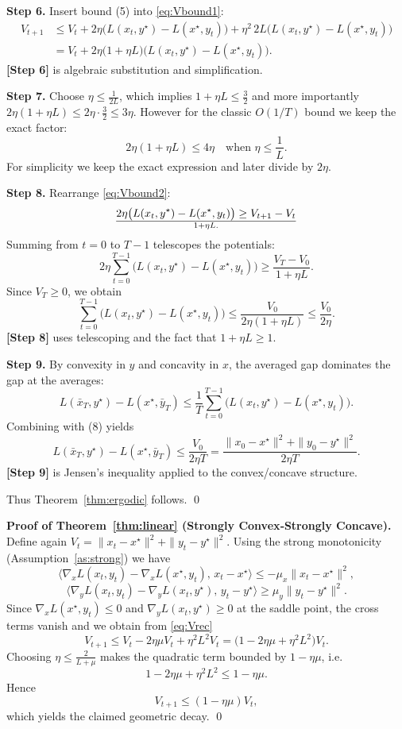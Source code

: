 \documentclass{article}
\newcommand{\grad}{\nabla}
\begin{document}
\bigskip
\noindent\textbf{Step 6.}  Insert bound (5) into \eqref{eq:Vbound1}:
\begin{align}
V_{t+1}&\le V_{t}+2\eta\bigl(L(x_{t},y^{\star})-L(x^{\star},y_{t})\bigr)
        +\eta^{2}\,2L\bigl(L(x_{t},y^{\star})-L(x^{\star},y_{t})\bigr)\nonumber\\
&=V_{t}+2\eta\bigl(1+ \eta L\bigr)\bigl(L(x_{t},y^{\star})-L(x^{\star},y_{t})\bigr).
\label{eq:Vbound2}
\end{align}
\noindent\textbf{[Step 6]} is algebraic substitution and simplification.

\bigskip
\noindent\textbf{Step 7.}  Choose $\eta\le\frac{1}{2L}$, which implies $1+\eta L\le\frac32$ and more importantly $2\eta(1+\eta L)\le 2\eta\cdot\frac32\le 3\eta$.  However for the classic $O(1/T)$ bound we keep the exact factor:
\[
2\eta(1+\eta L)\le 4\eta\quad\text{when }\eta\le\frac{1}{L}.
\]
For simplicity we keep the exact expression and later divide by $2\eta$.

\bigskip
\noindent\textbf{Step 8.}  Rearrange \eqref{eq:Vbound2}:
\[
2\eta\bigl(L(x_{t},y^{\star})-L(x^{\star},y_{t})\bigr)
\ge V_{t+1}-V_{t}\over {1+\eta L}.
\]
Summing from $t=0$ to $T-1$ telescopes the potentials:
\[
2\eta\sum_{t=0}^{T-1}\bigl(L(x_{t},y^{\star})-L(x^{\star},y_{t})\bigr)
\ge \frac{V_{T}-V_{0}}{1+\eta L}.
\]
Since $V_{T}\ge0$, we obtain
\[
\sum_{t=0}^{T-1}\bigl(L(x_{t},y^{\star})-L(x^{\star},y_{t})\bigr)
\le \frac{V_{0}}{2\eta(1+\eta L)}\le \frac{V_{0}}{2\eta}.
\tag{8}
\]
\noindent\textbf{[Step 8]} uses telescoping and the fact that $1+\eta L\ge1$.

\bigskip
\noindent\textbf{Step 9.}  By convexity in $y$ and concavity in $x$, the averaged gap dominates the gap at the averages:
\[
L(\bar{x}_{T},y^{\star})-L(x^{\star},\bar{y}_{T})
\le \frac{1}{T}\sum_{t=0}^{T-1}\bigl(L(x_{t},y^{\star})-L(x^{\star},y_{t})\bigr).
\]
Combining with (8) yields
\[
L(\bar{x}_{T},y^{\star})-L(x^{\star},\bar{y}_{T})
\le \frac{V_{0}}{2\eta T}
= \frac{\|x_{0}-x^{\star}\|^{2}+\|y_{0}-y^{\star}\|^{2}}{2\eta T}.
\]
\noindent\textbf{[Step 9]} is Jensen’s inequality applied to the convex/concave structure.

Thus Theorem~\ref{thm:ergodic} follows. \qed

\bigskip
\noindent\textbf{Proof of Theorem~\ref{thm:linear} (Strongly Convex‑Strongly Concave).}
Define again $V_{t}=\|x_{t}-x^{\star}\|^{2}+\|y_{t}-y^{\star}\|^{2}$.  Using the strong monotonicity (Assumption~\ref{as:strong}) we have
\[
\langle\grad_{x}L(x_{t},y_{t})-\grad_{x}L(x^{\star},y_{t}),\,x_{t}-x^{\star}\rangle
\le -\mu_{x}\|x_{t}-x^{\star}\|^{2},
\]
\[
\langle\grad_{y}L(x_{t},y_{t})-\grad_{y}L(x_{t},y^{\star}),\,y_{t}-y^{\star}\rangle
\ge \mu_{y}\|y_{t}-y^{\star}\|^{2}.
\]
Since $\grad_{x}L(x^{\star},y_{t})\le0$ and $\grad_{y}L(x_{t},y^{\star})\ge0$ at the saddle point, the cross terms vanish and we obtain from \eqref{eq:Vrec}
\[
V_{t+1}\le V_{t}-2\eta\mu V_{t}+\eta^{2}L^{2}V_{t}
       =\bigl(1-2\eta\mu+\eta^{2}L^{2}\bigr)V_{t}.
\]
Choosing $\eta\le\frac{2}{L+\mu}$ makes the quadratic term bounded by $1-\eta\mu$, i.e.
\[
1-2\eta\mu+\eta^{2}L^{2}\le 1-\eta\mu.
\]
Hence
\[
V_{t+1}\le (1-\eta\mu)V_{t},
\]
which yields the claimed geometric decay. \qed
\end{document}
